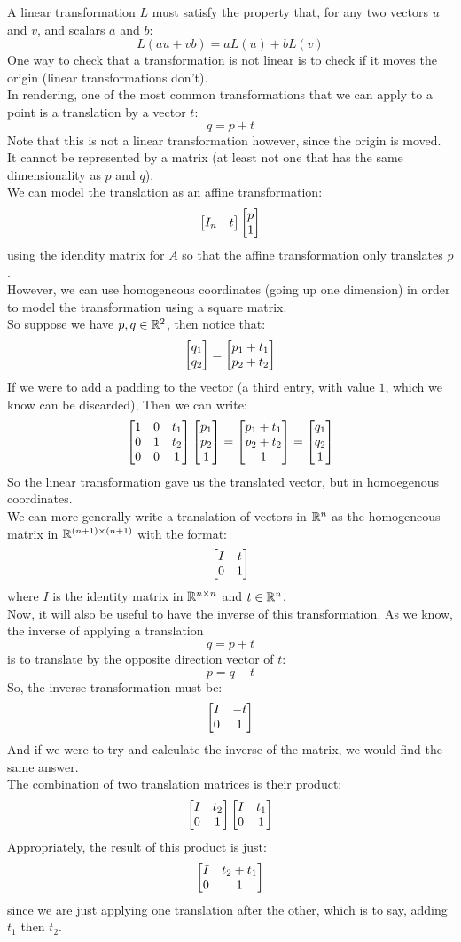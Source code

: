 \documentclass[12pt]{article}
\begin{document}
A linear transformation $L$ must satisfy the
property that, for any two vectors $u$ and $v$,
and scalars $a$ and $b$:
\[ L(au + vb) = aL(u) + bL(v) \]
One way to check that a transformation is not linear
is to check if it moves the origin (linear
transformations don't). \\

In rendering, one of the most common transformations
that we can apply to a point is a translation
by a vector $t$:
\[ q = p + t \]
Note that this is not a linear transformation however,
since the origin is moved. \\
It cannot be represented by a matrix
(at least not one that has the same dimensionality
as $p$ and $q$). \\

We can model the translation as an affine
transformation:
\[ \begin{bmatrix} I_n & t \end{bmatrix}\begin{bmatrix} p \\ 1 \end{bmatrix} \]
using the idendity matrix for $A$
so that the affine transformation only translates
$p$. \\

However, we can use homogeneous coordinates
(going up one dimension)
in order to model the transformation using a 
square matrix. \\
So suppose we have $p, q \in \mathbb{R}^2$,
then notice that:
\[ \begin{bmatrix} q_1 \\ q_2 \end{bmatrix} = \begin{bmatrix} p_1 + t_1 \\ p_2 + t_2 \end{bmatrix} \]
If we were to add a padding to the vector
(a third entry, with value $1$, 
which we know can be discarded),
Then we can write:
\[ \begin{bmatrix} 1 & 0 & t_1 \\ 0 & 1 & t_2 \\ 0 & 0 & 1 \end{bmatrix}
\begin{bmatrix} p_1 \\ p_2 \\ 1 \end{bmatrix} = \begin{bmatrix} p_1 + t_1 \\ p_2 + t_2 \\ 1 \end{bmatrix}
= \begin{bmatrix} q_1 \\ q_2 \\ 1 \end{bmatrix} \]
So the linear transformation gave us the translated vector,
but in homoegenous coordinates. \\
We can more generally write a translation of
vectors in $\mathbb{R}^n$ as the homogeneous matrix in
$\mathbb{R}^{(n+1) \times (n+1)}$ with the format:
\[ \begin{bmatrix} I & t \\ 0 & 1 \end{bmatrix} \]
where $I$ is the identity matrix in $\mathbb{R}^{n \times n}$
and $t \in \mathbb{R}^n$. \\

Now, it will also be useful to have the inverse of this
transformation.
As we know, the inverse of applying a translation
\[ q = p + t \]
is to translate by the opposite direction vector of $t$:
\[ p = q - t \]
So, the inverse transformation must be:
\[ \begin{bmatrix} I & -t \\ 0 & 1 \end{bmatrix} \]
And if we were to try and calculate the inverse of the
matrix, we would find the same answer. \\

The combination of two translation matrices
is their product:
\[ \begin{bmatrix} I & t_2 \\ 0 & 1 \end{bmatrix}\begin{bmatrix} I & t_1 \\ 0 & 1 \end{bmatrix} \]
Appropriately, the result of this product is
just:
\[ \begin{bmatrix} I & t_2 + t_1 \\ 0 & 1 \end{bmatrix} \]
since we are just applying one translation
after the other,
which is to say, adding $t_1$ then $t_2$. \\
\end{document}
